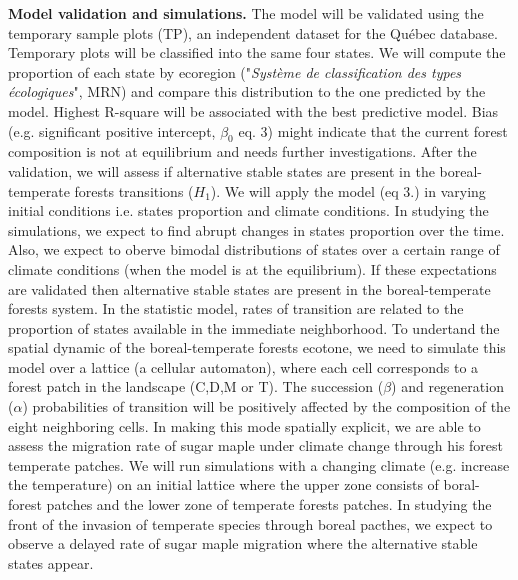 \textbf{Model validation and simulations.}  The model will be validated using
the temporary sample plots (TP), an independent dataset for the Québec
database. Temporary plots will be classified into the same four states. We
will compute the proportion of each state by ecoregion ("\textit{Système de
classification des types écologiques}", MRN) and compare this distribution to
the one predicted by the model.  Highest R-square will be associated with the
best predictive model. Bias (e.g. significant positive intercept, $\beta_0$
eq. 3) might indicate that the current forest composition is not at
equilibrium and needs further investigations.  After the validation, we will
assess if alternative stable states are present in the boreal-temperate
forests transitions ($H_1$). We will apply the model (eq 3.) in varying
initial conditions i.e. states proportion and climate conditions. In studying
the simulations, we expect to find abrupt changes in states proportion over
the time. Also, we expect to oberve bimodal distributions of states over a
certain range of climate conditions (when the model is at the equilibrium). If
these expectations are validated then alternative stable states are present in
the boreal-temperate forests system. In the statistic model, rates of
transition are related to the proportion of states available in the immediate
neighborhood. To undertand the spatial dynamic of the boreal-temperate forests
ecotone, we need to simulate this model over a lattice (a cellular automaton),
where each cell corresponds to a forest patch in the landscape (C,D,M or T).
The succession ($\beta$) and regeneration ($\alpha$) probabilities of
transition will be positively affected by the composition of the eight
neighboring cells. In making this mode spatially explicit, we are able to
assess the migration rate of sugar maple under climate change through his
forest temperate patches. We will run simulations with a changing climate
(e.g. increase the temperature) on an initial lattice where the upper zone
consists of boral-forest patches and the lower zone of temperate forests
patches. In studying the front of the invasion of temperate species through
boreal pacthes, we expect to observe a delayed rate of sugar maple migration
where the alternative stable states appear.

\clearpage

